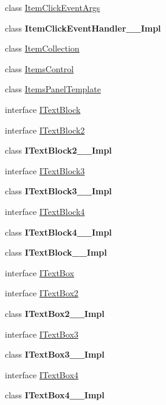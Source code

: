 \begin{DoxyCompactItemize}
class \hyperlink{class_windows_1_1_u_i_1_1_xaml_1_1_controls_1_1_item_click_event_args}{Item\+Click\+Event\+Args}
\item 
class {\bfseries Item\+Click\+Event\+Handler\+\_\+\+\_\+\+Impl}
\item 
class \hyperlink{class_windows_1_1_u_i_1_1_xaml_1_1_controls_1_1_item_collection}{Item\+Collection}
\item 
class \hyperlink{class_windows_1_1_u_i_1_1_xaml_1_1_controls_1_1_items_control}{Items\+Control}
\item 
class \hyperlink{class_windows_1_1_u_i_1_1_xaml_1_1_controls_1_1_items_panel_template}{Items\+Panel\+Template}
\item 
interface \hyperlink{interface_windows_1_1_u_i_1_1_xaml_1_1_controls_1_1_i_text_block}{I\+Text\+Block}
\item 
interface \hyperlink{interface_windows_1_1_u_i_1_1_xaml_1_1_controls_1_1_i_text_block2}{I\+Text\+Block2}
\item 
class {\bfseries I\+Text\+Block2\+\_\+\+\_\+\+Impl}
\item 
interface \hyperlink{interface_windows_1_1_u_i_1_1_xaml_1_1_controls_1_1_i_text_block3}{I\+Text\+Block3}
\item 
class {\bfseries I\+Text\+Block3\+\_\+\+\_\+\+Impl}
\item 
interface \hyperlink{interface_windows_1_1_u_i_1_1_xaml_1_1_controls_1_1_i_text_block4}{I\+Text\+Block4}
\item 
class {\bfseries I\+Text\+Block4\+\_\+\+\_\+\+Impl}
\item 
class {\bfseries I\+Text\+Block\+\_\+\+\_\+\+Impl}
\item 
interface \hyperlink{interface_windows_1_1_u_i_1_1_xaml_1_1_controls_1_1_i_text_box}{I\+Text\+Box}
\item 
interface \hyperlink{interface_windows_1_1_u_i_1_1_xaml_1_1_controls_1_1_i_text_box2}{I\+Text\+Box2}
\item 
class {\bfseries I\+Text\+Box2\+\_\+\+\_\+\+Impl}
\item 
interface \hyperlink{interface_windows_1_1_u_i_1_1_xaml_1_1_controls_1_1_i_text_box3}{I\+Text\+Box3}
\item 
class {\bfseries I\+Text\+Box3\+\_\+\+\_\+\+Impl}
\item 
interface \hyperlink{interface_windows_1_1_u_i_1_1_xaml_1_1_controls_1_1_i_text_box4}{I\+Text\+Box4}
\item 
class {\bfseries I\+Text\+Box4\+\_\+\+\_\+\+Impl}
\item 

\end{DoxyCompactItemize}
